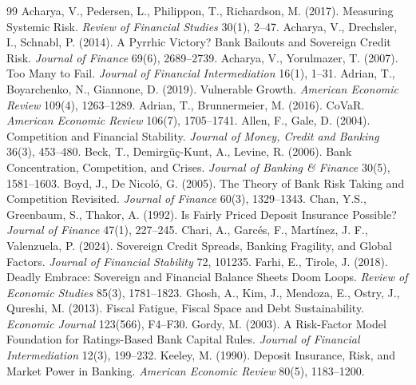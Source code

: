 \documentclass[11pt]{article}
\theoremstyle{plain}
\theoremstyle{definition}
\theoremstyle{remark}
\newcommand{\1}{\mathbf{1}}
\begin{document}
\begin{thebibliography}{99}
\small
{} Acharya, V., Pedersen, L., Philippon, T., Richardson, M. (2017). Measuring Systemic Risk. \textit{Review of Financial Studies} 30(1), 2--47.
 Acharya, V., Drechsler, I., Schnabl, P. (2014). A Pyrrhic Victory? Bank Bailouts and Sovereign Credit Risk. \textit{Journal of Finance} 69(6), 2689--2739.
 Acharya, V., Yorulmazer, T. (2007). Too Many to Fail. \textit{Journal of Financial Intermediation} 16(1), 1--31.
 Adrian, T., Boyarchenko, N., Giannone, D. (2019). Vulnerable Growth. \textit{American Economic Review} 109(4), 1263--1289.
 Adrian, T., Brunnermeier, M. (2016). CoVaR. \textit{American Economic Review} 106(7), 1705--1741.
 Allen, F., Gale, D. (2004). Competition and Financial Stability. \textit{Journal of Money, Credit and Banking} 36(3), 453--480.
 Beck, T., Demirgüç-Kunt, A., Levine, R. (2006). Bank Concentration, Competition, and Crises. \textit{Journal of Banking \& Finance} 30(5), 1581--1603.
 Boyd, J., De Nicoló, G. (2005). The Theory of Bank Risk Taking and Competition Revisited. \textit{Journal of Finance} 60(3), 1329--1343.
 Chan, Y.S., Greenbaum, S., Thakor, A. (1992). Is Fairly Priced Deposit Insurance Possible? \textit{Journal of Finance} 47(1), 227--245.
 Chari, A., Garcés, F., Martínez, J. F., Valenzuela, P. (2024). Sovereign Credit Spreads, Banking Fragility, and Global Factors. \textit{Journal of Financial Stability} 72, 101235.
 Farhi, E., Tirole, J. (2018). Deadly Embrace: Sovereign and Financial Balance Sheets Doom Loops. \textit{Review of Economic Studies} 85(3), 1781--1823.
 Ghosh, A., Kim, J., Mendoza, E., Ostry, J., Qureshi, M. (2013). Fiscal Fatigue, Fiscal Space and Debt Sustainability. \textit{Economic Journal} 123(566), F4--F30.
 Gordy, M. (2003). A Risk-Factor Model Foundation for Ratings-Based Bank Capital Rules. \textit{Journal of Financial Intermediation} 12(3), 199--232.
 Keeley, M. (1990). Deposit Insurance, Risk, and Market Power in Banking. \textit{American Economic Review} 80(5), 1183--1200.

\end{thebibliography}
\end{document}

